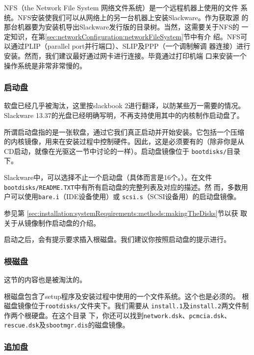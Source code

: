 NFS（the Network File System 网络文件系统）是一个远程机器上使用的文件
系统。NFS安装使我们可以从网络上的另一台机器上安装Slackware。作为获取源
的那台机器要为安装机导出Slackware发行版的目录树。当然，这需要关于NFS的
一定知识，在第\ref{sec:networkConfiguration:networkFileSystem}节中有介
绍。NFS可以通过PLIP（parallel port并行端口）、SLIP及PPP（一个调制解调
器连接）进行安装。然而，我们建议最好通过网卡进行连接。毕竟通过打印机端
口来安装一个操作系统是非常非常慢的。

\subsubsection{启动盘}
\label{sec:installation:systemRequirements:methods:bootDisk}

软盘已经几乎被淘汰，这里按slackbook 2进行翻译，以防某些万一需要的情况。
Slackware 13.37的光盘已经明确写明，不再支持使用其中的内核制作启动盘了。

所谓启动盘指的是一张软盘，通过它我们真正启动并开始安装。它包括一个压缩
的内核镜像，用来在安装过程中控制硬件。因此，这是必须要有的（除非你是从
CD启动，就像在光驱这一节中讨论的一样）。启动盘镜像位于
\texttt{bootdisks/}目录下。

Slackware中，可以选择不止一个启动盘（具体而言是16个。）。在文件
\texttt{bootdisks/README.TXT}中有所有启动盘的完整列表及对应的描述。然
而，多数用户可以使用\texttt{bare.i}（IDE设备使用）或
\texttt{scsi.s}（SCSI设备用）的启动盘镜像。

参见第
\ref{sec:installation:systemRequirements:methods:makingTheDisks}节以获
取关于从镜像制作启动盘的介绍。

启动之后，会有提示要求插入根磁盘。我们建议你按照启动盘的提示进行。
\subsubsection{根磁盘}
\label{sec:installation:systemRequirements:methods:rootDisk}

这节的内容也是被淘汰的。

根磁盘包含了setup程序及安装过程中使用的一个文件系统。这个也是必须的。
根磁盘镜像位于\texttt{rootdisks/}文件夹下。我们需要从
\texttt{install.1}及\texttt{install.2}两文件制作两个根硬盘。在这个目录
下，你还可以找到\texttt{network.dsk}、\texttt{pcmcia.dsk}、
\texttt{rescue.dsk}及\texttt{sbootmgr.dis}的磁盘镜像。

\subsubsection{追加盘}
\label{sec:installation:systemRequirements:methods:supplementalDisk}


